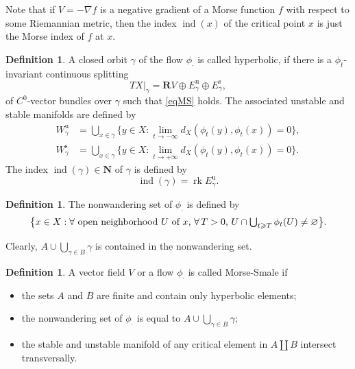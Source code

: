 \documentclass[11pt]{article}
\numberwithin{equation}{section}
\newcommand{\rs}{\mathrm{s}}
\newcommand{\ru}{\mathrm{u}}
\theoremstyle{plain}
\theoremstyle{definition}
\newtheorem{defin}[lem]{Definition}
\theoremstyle{remark}
\newcommand{\bN}{\mathbf{N}}
\newcommand{\bR}{\mathbf{R}}
\DeclareMathOperator{\ind}{ind}
\DeclareMathOperator{\rk}{rk}
\let\g\geqslant
\begin{document}
Note that if $V=-\nabla f$ is a negative gradient of a Morse function
$f$
with respect to some Riemannian metric, then the index $\ind(x)$ of
the critical point $x$ is just the Morse index of $f$ at $x$.

\begin{defin}
A closed orbit $\gamma$ of the flow $\phi_{\cdot}$ is called hyperbolic,
if there is a $\phi_{t}$-invariant continuous splitting\vspace*{-3pt}
\begin{equation*}\label{eq:AF1}
TX|_{\gamma}=\bR V\oplus E^{\ru}_{\gamma}\oplus E^{\rs}_{\gamma},
\end{equation*}
of $C^{0}$-vector
bundles over $\gamma$ such that \eqref{eqMS} holds. The associated unstable and
stable manifolds are defined by
\begin{equation*}
\begin{aligned}
W^{\ru}_{\gamma}&=\bigcup_{x\in \gamma} \bigl\{y\in X: \textstyle\lim_{t\to
-\infty}d_{X}(\phi_{t}(y),\phi_{t}(x))=0 \bigr\},\\
W^{\rs}_{\gamma}&=\bigcup_{x\in \gamma} \bigl\{y\in X: \textstyle\lim_{t\to
+\infty}d_{X}(\phi_{t}(y),\phi_{t}(x))=0 \bigr\}.
\end{aligned}
\end{equation*}
The index $\ind(\gamma)\in \bN$ of $\gamma$ is defined by
\begin{equation}\label{indexg}
\ind(\gamma)=\rk E^{\ru}_{\gamma}.
\end{equation}
\end{defin}

\begin{defin}
The nonwandering set of $\phi_{\cdot}$ is defined by\vspace*{-3pt}
\begin{equation*}\textstyle
\bigl\{x\in X: \hbox{$\forall$ open neighborhood $U$ of $x$,
$\forall\, T>0$, } U\cap\bigcup_{t\g T} \phi_{t}(U)\neq
\varnothing \bigr\}.
\end{equation*}
\end{defin}
Clearly, $A\cup \bigcup_{\gamma\in B}\gamma$ is contained in the nonwandering set.

\begin{defin}
A vector field $V$ or a flow $\phi_{\cdot}$ is called Morse-Smale if
\begin{itemize}
\item the sets $A$ and $B$ are finite and contain only hyperbolic elements;
\item the nonwandering set of
$\phi_{\cdot}$ is equal to
$ A\cup \bigcup_{\gamma\in B}\gamma$;
\item the stable and unstable manifold of any critical
element in $A\coprod B$ intersect transversally.
\end{itemize}
\end{defin}
\end{document}
